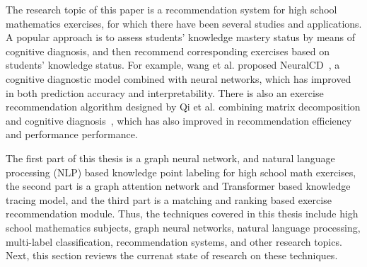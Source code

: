 The research topic of this paper is a recommendation system for high school mathematics exercises, for which there have been several studies and applications. A popular approach is to assess students' knowledge mastery status by means of cognitive diagnosis, and then recommend corresponding exercises based on students' knowledge status. For example, wang et al. proposed NeuralCD~\cite{wang_neural_2020}, a cognitive diagnostic model combined with neural networks, which has improved in both prediction accuracy and interpretability. There is also an exercise recommendation algorithm designed by Qi et al. combining matrix decomposition and cognitive diagnosis~\cite{qicd_2019}, which has also improved in recommendation efficiency and performance performance.


The first part of this thesis is a graph neural network, and natural language processing (NLP) based knowledge point labeling for high school math exercises, the second part is a graph attention network and Transformer based knowledge tracing model, and the third part is a matching and ranking based exercise recommendation module. Thus, the techniques covered in this thesis include high school mathematics subjects, graph neural networks, natural language processing, multi-label classification, recommendation systems, and other research topics. Next, this section reviews the currenat state of research on these techniques.

